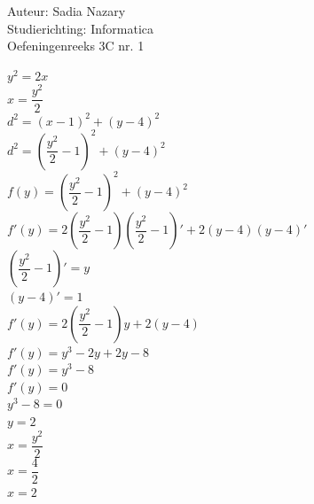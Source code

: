 \documentclass[a4paper]{article}
\begin{document}
  
\noindent \large Auteur: Sadia Nazary  \\
\noindent \large Studierichting: Informatica\\
\noindent \large Oefeningenreeks 3C nr. 1\\

\medskip

\normalsize

$y^2=2x$ \\

$x=\dfrac{y^2}{2}$ \\

$d^2=(x-1)^2+(y-4)^2$ \\

$d^2=\left(\dfrac{y^2}{2}-1\right)^2+(y-4)^2$ \\

$f(y)=\left(\dfrac{y^2}{2}-1\right)^2+(y-4)^2$ \\

$f'(y)=2\left(\dfrac{y^2}{2}-1\right)\left(\dfrac{y^2}{2}-1\right)'+2(y-4)(y-4)'$ \\

$\left(\dfrac{y^2}{2}-1\right)'=y$ \\

$(y-4)'=1$ \\

$f'(y)=2\left(\dfrac{y^2}{2}-1\right)y+2(y-4)$ \\

$f'(y)=y^3-2y+2y-8$ \\

$f'(y)=y^3-8$ \\

$f'(y)=0$ \\

$y^3-8=0$ \\

$y=2$ \\

$x=\dfrac{y^2}{2}$ \\

$x=\dfrac{4}{2}$ \\

$x=2$ \\

\end{document}
